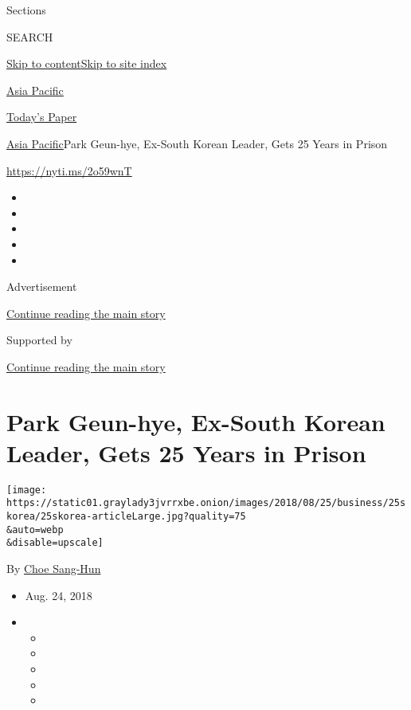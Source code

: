 Sections

SEARCH

\protect\hyperlink{site-content}{Skip to
content}\protect\hyperlink{site-index}{Skip to site index}

\href{https://www.nytimes3xbfgragh.onion/section/world/asia}{Asia
Pacific}

\href{https://myaccount.nytimes3xbfgragh.onion/auth/login?response_type=cookie\&client_id=vi}{}

\href{https://www.nytimes3xbfgragh.onion/section/todayspaper}{Today's
Paper}

\href{/section/world/asia}{Asia Pacific}\textbar{}Park Geun-hye,
Ex-South Korean Leader, Gets 25 Years in Prison

\url{https://nyti.ms/2o59wnT}

\begin{itemize}
\item
\item
\item
\item
\item
\end{itemize}

Advertisement

\protect\hyperlink{after-top}{Continue reading the main story}

Supported by

\protect\hyperlink{after-sponsor}{Continue reading the main story}

\hypertarget{park-geun-hye-ex-south-korean-leader-gets-25-years-in-prison}{%
\section{Park Geun-hye, Ex-South Korean Leader, Gets 25 Years in
Prison}\label{park-geun-hye-ex-south-korean-leader-gets-25-years-in-prison}}

\texttt{[image: https://static01.graylady3jvrrxbe.onion/images/2018/08/25/business/25skorea/25skorea-articleLarge.jpg?quality=75\\\&auto=webp\\\&disable=upscale]}

By \href{http://www.nytimes3xbfgragh.onion/by/choe-sang-hun}{Choe
Sang-Hun}

\begin{itemize}
\item
  Aug. 24, 2018
\item
  \begin{itemize}
  \item
  \item
  \item
  \item
  \item
  \end{itemize}
\end{itemize}


